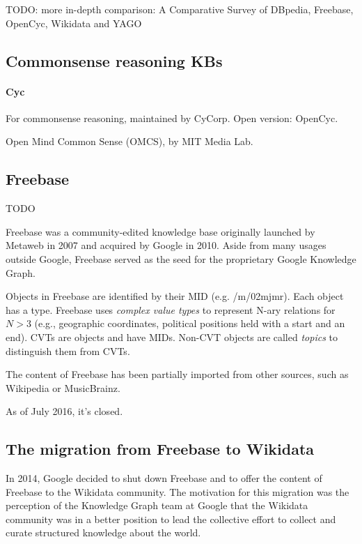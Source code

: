 TODO: more in-depth comparison: A Comparative Survey of DBpedia, Freebase,
OpenCyc, Wikidata and YAGO

\subsection{Commonsense reasoning KBs}

\paragraph{Cyc} For commonsense reasoning, maintained by CyCorp.
Open version: OpenCyc.

Open Mind Common Sense (OMCS), by MIT Media Lab.

\subsection{Freebase}

TODO

Freebase was a community-edited knowledge base originally launched by Metaweb in
2007 and acquired by Google in 2010. Aside from many usages outside Google,
Freebase served as the seed for the proprietary Google Knowledge
Graph\cite{kg-refinement-survey}.

Objects in Freebase are identified by their MID (e.g. /m/02mjmr). Each object
has a type.
Freebase uses \textit{complex value types} to represent N-ary relations for
$N>3$ (e.g., geographic coordinates, political positions held with a start and
an end). CVTs are objects and have MIDs. Non-CVT objects are called
\textit{topics} to distinguish them from CVTs.

The content of Freebase has been partially imported from other sources, such as
Wikipedia or MusicBrainz.

As of July 2016, it's closed.

\subsection{The migration from Freebase to Wikidata\cite{freebase-wikidata-migration}}

In 2014, Google decided to shut down Freebase and to offer the content
of Freebase to the Wikidata community.
The motivation for this migration was the perception of the Knowledge Graph team
at Google that the Wikidata community was in a better position to lead the
collective effort to collect and curate structured knowledge about the world.

